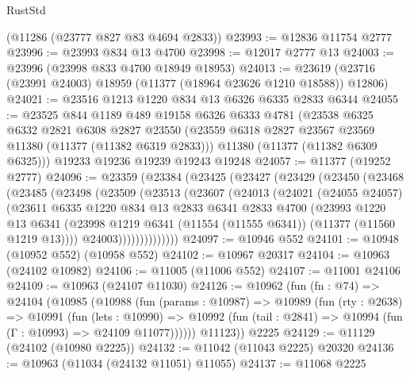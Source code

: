 \begin{lexlean}{RustStd}
\begin{coremodule}
    (@11286 (@23777 @827 @83 @4694 @2833))
@23993 := @12836 @11754 @2777
@23996 := @23993 @834 @13 @4700
@23998 := @12017 @2777 @13
@24003 := @23996 (@23998 @833 @4700 @18949 @18953)
@24013 := @23619 (@23716 (@23991 @24003) @18959 (@11377 (@18964 @23626 @1210 @18588)) @12806)
@24021 := @23516 @1213 @1220 @834 @13 @6326 @6335 @2833 @6344
@24055 := @23525
    @844
    @1189
    @489
    @19158
    @6326
    @6333
    @4781
    (@23538
      @6325
      @6332
      @2821
      @6308
      @2827
      @23550
      (@23559 @6318 @2827 @23567 @23569 @11380 (@11377 (@11382 @6319 @2833)))
      @11380
      (@11377 (@11382 @6309 @6325)))
    @19233
    @19236
    @19239
    @19243
    @19248
@24057 := @11377 (@19252 @2777)
@24096 := @23359
    (@23384
      (@23425
        (@23427
          (@23429
            (@23450
              (@23468
                (@23485
                  (@23498
                    (@23509
                      (@23513
                        (@23607
                          (@24013
                            (@24021
                              (@24055 @24057)
                              (@23611
                                @6335
                                @1220
                                @834
                                @13
                                @2833
                                @6341
                                @2833
                                @4700
                                (@23993
                                  @1220
                                  @13
                                  @6341
                                  (@23998
                                    @1219
                                    @6341
                                    (@11554 (@11555 @6341))
                                    (@11377 (@11560 @1219 @13))))
                                @24003))))))))))))))
@24097 := @10946 @552
@24101 := @10948 (@10952 @552) (@10958 @552)
@24102 := @10967 @20317
@24104 := @10963 (@24102 @10982)
@24106 := @11005 (@11006 @552)
@24107 := @11001 @24106
@24109 := @10963 (@24107 @11030)
@24126 := @10962
    (fun (fn : @74) =>
    @24104
      (@10985
        (@10988
          (fun (params : @10987) =>
          @10989
            (fun (rty : @2638) =>
            @10991
              (fun (lets : @10990) =>
              @10992 (fun (tail : @2841) => @10994 (fun (Γ : @10993) => @24109 @11077))))))
        @11123))
    @2225
@24129 := @11129 (@24102 (@10980 @2225))
@24132 := @11042 (@11043 @2225) @20320
@24136 := @10963 (@11034 (@24132 @11051) @11055)
@24137 := @11068 @2225

\end{coremodule}
\end{lexlean}
